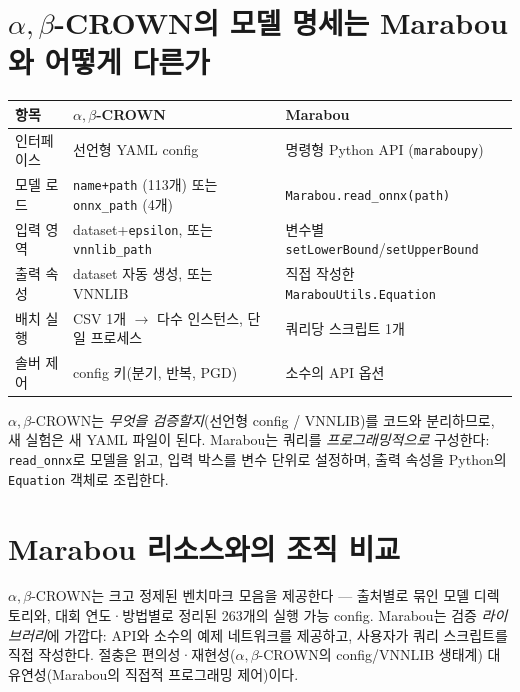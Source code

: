 \documentclass[10pt]{article}
\newcommand{\abc}{$\alpha,\beta$-CROWN}
\begin{document}
\section{\abc{}의 모델 명세는 Marabou와 어떻게 다른가}
\begin{table}[H]\centering\small
\begin{tabular}{lll}
\toprule
항목 & \abc{} & Marabou \\
\midrule
인터페이스 & 선언형 YAML config & 명령형 Python API (\texttt{maraboupy}) \\
모델 로드 & \texttt{name+path} (113개) 또는 \texttt{onnx\_path} (4개) & \texttt{Marabou.read\_onnx(path)} \\
입력 영역 & dataset+\texttt{epsilon}, 또는 \texttt{vnnlib\_path} & 변수별 \texttt{setLowerBound}/\texttt{setUpperBound} \\
출력 속성 & dataset 자동 생성, 또는 VNNLIB & 직접 작성한 \texttt{MarabouUtils.Equation} \\
배치 실행 & CSV 1개 $\to$ 다수 인스턴스, 단일 프로세스 & 쿼리당 스크립트 1개 \\
솔버 제어 & config 키(분기, 반복, PGD) & 소수의 API 옵션 \\
\bottomrule
\end{tabular}
\end{table}

\abc{}는 \emph{무엇을 검증할지}(선언형 config / VNNLIB)를 코드와 분리하므로, 새 실험은 새
YAML 파일이 된다. Marabou는 쿼리를 \emph{프로그래밍적으로} 구성한다: \texttt{read\_onnx}로
모델을 읽고, 입력 박스를 변수 단위로 설정하며, 출력 속성을 Python의 \texttt{Equation}
객체로 조립한다.

\section{Marabou 리소스와의 조직 비교}
\abc{}는 크고 정제된 벤치마크 모음을 제공한다 --- 출처별로 묶인 모델 디렉토리와, 대회
연도·방법별로 정리된 263개의 실행 가능 config. Marabou는 검증 \emph{라이브러리}에 가깝다:
API와 소수의 예제 네트워크를 제공하고, 사용자가 쿼리 스크립트를 직접 작성한다. 절충은
편의성·재현성(\abc{}의 config/VNNLIB 생태계) 대 유연성(Marabou의 직접적 프로그래밍 제어)이다.
\end{document}
